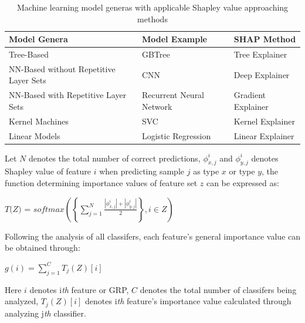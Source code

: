 \documentclass[fleqn,10pt]{wlscirep}
\begin{document}
\begin{table}[ht]
\centering
\begin{tabular}{|l|l|l|}
\hline
\textbf{Model Genera} & \textbf{Model Example} & \textbf{SHAP\cite{lundberg2017unified} Method}  \\
\hline
Tree-Based & GBTree & Tree Explainer \\
\hline
NN-Based without Repetitive Layer Sets & CNN & Deep Explainer \\
\hline
NN-Based with Repetitive Layer Sets & Recurrent Neural Network & Gradient Explainer \\
\hline
Kernel Machines & SVC & Kernel Explainer \\
\hline
Linear Models & Logistic Regression & Linear Explainer \\
\hline
\end{tabular}
\caption{\label{shap}Machine learning model generas with applicable Shapley value approaching methods}
\end{table}

Let $N$ denotes the total number of correct predictions, $\phi_{x,j}^{i}$ and $\phi_{y,j}^{i}$ denotes Shapley value of feature $i$ when predicting sample $j$ as type $x$ or type $y$, the function determining importance values of feature set $z$ can be expressed as:

\centerline{$\textit{T(Z) = softmax}(\left\{\sum_{j = 1}^{N}\frac{\left|\phi_{x,j}^{i}\right| + \left|\phi_{y,j}^{i}\right|}{2}\right\}, i \in Z)$}

Following the analysis of all classifers, each feature's general importance value can be obtained through:

\centerline{$g(i) = \sum_{j = 1}^{C}T_{j}(Z)[i]$}

Here $i$ denotes i\emph{th} feature or GRP, $C$ denotes the total number of classifers being analyzed, $T_{j}(Z)[i]$ denotes i\emph{th} feature's importance value calculated through analyzing j\emph{th} classifier.
\end{document}
